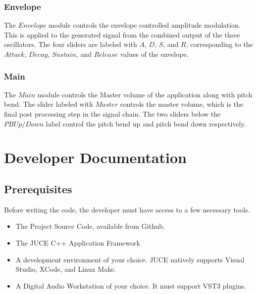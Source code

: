 \documentclass[a4paper,12pt]{report}
\begin{document}

\subsection{Envelope}
\label{subsec:env}
The $Envelope$ module controls the envelope controlled amplitude modulation. This is applied to the generated signal from the combined output of the three oscillators. The four sliders are labeled with $A$, $D$, $S$, and $R$, corresponding to the $Attack$, $Decay$, $Sustain$, and $Release$ values of the envelope.


\subsection{Main}
\label{subsec:main}
The $Main$ module controls the Master volume of the application along with pitch bend. The slider labeled with $Master$ controls the master volume, which is the final post processing step in the signal chain. The two sliders below the $PB Up/Down$ label control the pitch bend up and pitch bend down respectively.



\chapter{Developer Documentation}
\label{chapter:devdocs}

\section{Prerequisites}
\label{sec:prereq}
Before writing the code, the developer must have access to a few necessary tools.
\begin{itemize}
\item The Project Source Code, available from Github.
\item The JUCE C++ Application Framework
\item A development environment of your choice. JUCE natively supports Visual Studio, XCode, and Linux Make.
\item A Digital Audio Workstation of your choice. It must support VST3 plugins.
\end{itemize}
\end{document}
